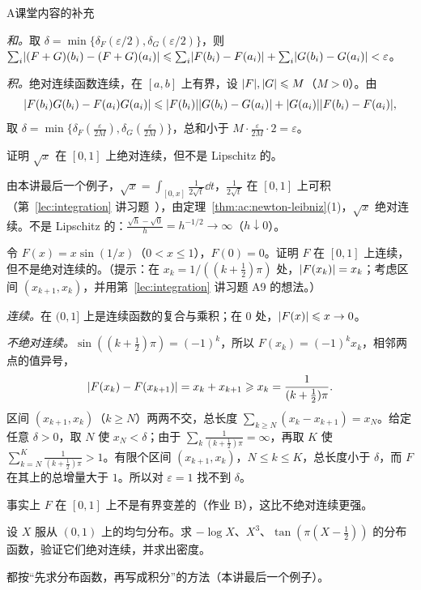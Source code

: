 \begin{exercises}{A}{课堂内容的补充}
\begin{questions}
\begin{solution}
\emph{和。}取 $\delta=\min\{\delta_F(\varepsilon/2),\delta_G(\varepsilon/2)\}$，则 $\sum_i\lvert (F+G)(b_i)-(F+G)(a_i)\rvert\leqslant\sum_i\lvert F(b_i)-F(a_i)\rvert+\sum_i\lvert G(b_i)-G(a_i)\rvert<\varepsilon$。

\emph{积。}绝对连续函数连续，在 $[a,b]$ 上有界，设 $\lvert F\rvert,\lvert G\rvert\leqslant M$（$M>0$）。由
\[
\lvert F(b_i)G(b_i)-F(a_i)G(a_i)\rvert\leqslant\lvert F(b_i)\rvert\lvert G(b_i)-G(a_i)\rvert+\lvert G(a_i)\rvert\lvert F(b_i)-F(a_i)\rvert,
\]
取 $\delta=\min\{\delta_F(\frac\varepsilon{2M}),\delta_G(\frac\varepsilon{2M})\}$，总和小于 $M\cdot\frac\varepsilon{2M}\cdot2=\varepsilon$。
\end{solution}
\item 证明 $\sqrt x$ 在 $[0,1]$ 上绝对连续，但不是 Lipschitz 的。
\begin{solution}
由本讲最后一个例子，$\sqrt x=\int_{[0,x]}\frac1{2\sqrt t}\dd t$，$\frac1{2\sqrt t}$ 在 $[0,1]$ 上可积（第~\ref{lec:integration} 讲习题~），由定理~\ref{thm:ac:newton-leibniz}(1)，$\sqrt x$ 绝对连续。不是 Lipschitz 的：$\frac{\sqrt h-\sqrt0}{h}=h^{-1/2}\to\infty$（$h\downarrow0$）。
\end{solution}
\end{questions}

\item\label{ex:ac:A9} 令 $F(x)=x\sin(1/x)$（$0<x\leqslant1$），$F(0)=0$。证明 $F$ 在 $[0,1]$ 上连续，但不是绝对连续的。（提示：在 $x_k=1/((k+\frac12)\pi)$ 处，$\lvert F(x_k)\rvert=x_k$；考虑区间 $(x_{k+1},x_k)$，并用第~\ref{lec:integration} 讲习题 A9 的想法。）
\begin{solution}
\emph{连续。}在 $(0,1]$ 上是连续函数的复合与乘积；在 $0$ 处，$\lvert F(x)\rvert\leqslant x\to0$。

\emph{不绝对连续。}$\sin((k+\frac12)\pi)=(-1)^k$，所以 $F(x_k)=(-1)^kx_k$，相邻两点的值异号，
\[
\lvert F(x_k)-F(x_{k+1})\rvert=x_k+x_{k+1}\geqslant x_k=\frac1{(k+\frac12)\pi}.
\]
区间 $(x_{k+1},x_k)$（$k\geqslant N$）两两不交，总长度 $\sum_{k\geqslant N}(x_k-x_{k+1})=x_N$。给定任意 $\delta>0$，取 $N$ 使 $x_N<\delta$；由于 $\sum_k\frac1{(k+\frac12)\pi}=\infty$，再取 $K$ 使 $\sum_{k=N}^K\frac1{(k+\frac12)\pi}>1$。有限个区间 $(x_{k+1},x_k)$，$N\leqslant k\leqslant K$，总长度小于 $\delta$，而 $F$ 在其上的总增量大于 $1$。所以对 $\varepsilon=1$ 找不到 $\delta$。

事实上 $F$ 在 $[0,1]$ 上不是有界变差的（作业 B），这比不绝对连续更强。
\end{solution}

\item\label{ex:ac:A10} 设 $X$ 服从 $(0,1)$ 上的均匀分布。求 $-\log X$、$X^3$、$\tan(\pi(X-\frac12))$ 的分布函数，验证它们绝对连续，并求出密度。
\begin{solution}
都按“先求分布函数，再写成积分”的方法（本讲最后一个例子）。


\end{solution}
\end{exercises}
